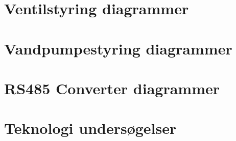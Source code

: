 \newpage
\section{Ventilstyring diagrammer}


\newpage
\section{Vandpumpestyring diagrammer}


\newpage
\section{RS485 Converter diagrammer}

\newpage
\section{Teknologi undersøgelser}
